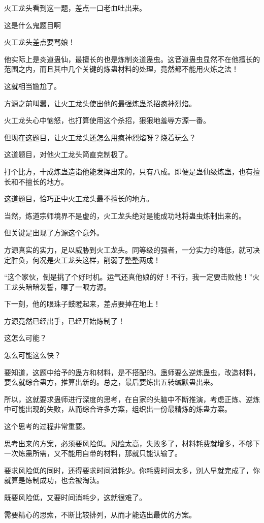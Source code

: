 \begin{this_body}
火工龙头看到这一题，差点一口老血吐出来。

这是什么鬼题目啊

火工龙头差点要骂娘！

他实际上是炎道蛊仙，最擅长的也是炼制炎道蛊虫。这音道蛊虫显然不在他擅长的范围之内，而且其中几个关键的炼蛊材料的处理，竟然都不能用火炼之法！

这就相当尴尬了。

方源之前叫嚣，让火工龙头使出他的最强炼蛊杀招疯神烈焰。

火工龙头心中恼怒，也打算使用这个杀招，狠狠地羞辱方源一番。

但现在这题目，让火工龙头还怎么用疯神烈焰呀？烧着玩么？

这道题目，对他火工龙头简直克制极了。

打个比方，十成炼蛊造诣他能发挥出来的，只有八成。即便是蛊仙级炼蛊，也有擅长和不擅长的地方。

这道题目，恰巧正中火工龙头最不擅长的地方。

当然，炼道宗师境界不是虚的，火工龙头绝对是能成功地将蛊虫炼制出来的。

但关键是出现了方源这个意外。

方源真实的实力，足以威胁到火工龙头。同等级的强者，一分实力的降低，就可决定胜负，何况是火工龙头这样，削弱了整整两成！

“这个家伙，倒是挑了个好时机。运气还真他娘的好！不行，我一定要击败他！”火工龙头暗暗发誓，瞟了一眼方源。

下一刻，他的眼珠子鼓瞪起来，差点要掉在地上！

方源竟然已经出手，已经开始炼制了！

这怎么可能？

怎么可能这么快？

要知道，这题中给予的蛊方和材料，是不搭配的。蛊师要么逆炼蛊虫，改造材料，要么就综合蛊方，推算出新的。总之，最后要炼出五转缄默蛊出来。

所以，这就要求蛊师进行深度的思考，在自家的头脑中不断推演，考虑正炼、逆炼中可能出现的失败，从而综合许多方案，组织出一份最精炼的炼蛊方案。

这个思考的过程非常重要。

思考出来的方案，必须要风险低。风险太高，失败多了，材料耗费就增多，不够下一次炼蛊所需，又不能用自带的材料，那就只能认输了。

要求风险低的同时，还得要求时间消耗少。你耗费时间太多，别人早就完成了，你就算是炼制成功，也会被淘汰。

既要风险低，又要时间消耗少，这就很难了。

需要精心的思索，不断比较排列，从而才能选出最优的方案。


\end{this_body}
